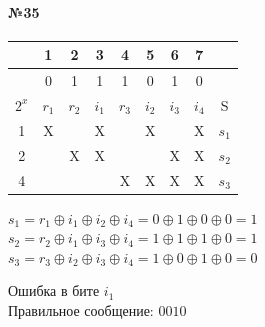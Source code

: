 \documentclass[12pt,onecolumn]{article}
\begin{document}
\begin{flushleft}
\paragraph{№35}
\hfill \break
\FloatBarrier
\begin{table}[h!]
  \begin{tabular}{|c|c|c|c|c|c|c|c|c|}
  \hline
                       & 1                         & 2                         & 3                         & 4                         & 5                         & 6                         & 7                         &      \\ \hline
                       & 0                         & 1                         & 1                         & 1                         & 0                         & 1                         & 0                         &      \\ \hline
  $2^x$ & $r_1$                     & $r_2$                      & $i_1$                      & $r_3$                      & $i_2$                      & $i_3$                      & $i_4$                      & S    \\ \hline
  1                    & \cellcolor[HTML]{32CB00}X &                           & \cellcolor[HTML]{32CB00}X &                           & \cellcolor[HTML]{32CB00}X &                           & \cellcolor[HTML]{32CB00}X & $s_1$ \\ \hline
  2                    &                           & \cellcolor[HTML]{34CDF9}X & \cellcolor[HTML]{34CDF9}X &                           &                           & \cellcolor[HTML]{34CDF9}X & \cellcolor[HTML]{34CDF9}X & $s_2$ \\ \hline
  4                    &                           &                           &                           & \cellcolor[HTML]{FFCC67}X & \cellcolor[HTML]{FFCC67}X & \cellcolor[HTML]{FFCC67}X & \cellcolor[HTML]{FFCC67}X & $s_3$ \\ \hline
  \end{tabular}
\end{table}
\begin{flushleft}
  $s_1 = r_1\oplus i_1 \oplus i_2 \oplus i_4 = 0 \oplus 1 \oplus 0 \oplus 0 = 1 $\\
  $s_2 = r_2\oplus i_1 \oplus i_3 \oplus i_4 = 1 \oplus 1 \oplus 1 \oplus 0 = 1 $\\
  $s_3 = r_3\oplus i_2 \oplus i_3 \oplus i_4 = 1 \oplus 0 \oplus 1 \oplus 0 = 0 $\\
\end{flushleft}
Ошибка в бите $i_1$\\
Правильное сообщение: $0010$
\newpage

\end{flushleft}
\end{document}
